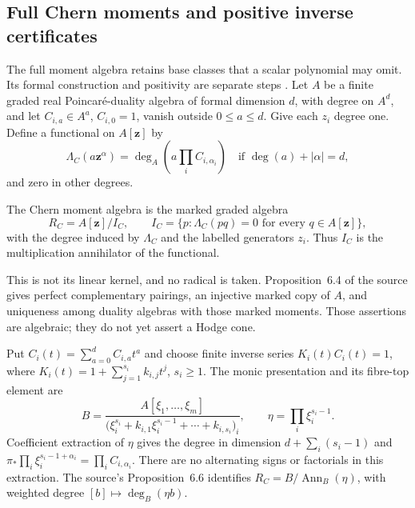 \subsection{Full Chern moments and positive inverse certificates}
\label{sec:appF-Chern-moments}

The full moment algebra retains base classes that a scalar polynomial
may omit. Its formal construction and positivity are separate steps
\cite[\S6]{NguyenDangWang26ChernFlowV4}.
Let $A$ be a finite graded real Poincar\'e-duality algebra of formal
dimension $d$, with degree on $A^d$, and let $C_{i,a}\in A^a$,
$C_{i,0}=1$, vanish outside $0\leq a\leq d$.
Give each $z_i$ degree one. Define a functional on $A[\mathbf z]$ by
\[
 \Lambda_C(a\mathbf z^\alpha)
     =\deg_A\left(a\prod_i C_{i,\alpha_i}\right)
       \quad\text{if }\deg(a)+|\alpha|=d,
\tag{F.35}\label{eq:appF-Chern-moment-functional}
\]
and zero in other degrees.
\begin{definition}
\label{def:appF-Chern-moment-algebra}
The Chern moment algebra is the marked graded algebra
\[
 R_C=A[\mathbf z]/I_C,\qquad
 I_C=\{p:\Lambda_C(pq)=0\text{ for every }q\in A[\mathbf z]\},
\tag{F.36}\label{eq:appF-Chern-moment-algebra}
\]
with the degree induced by $\Lambda_C$ and the labelled generators
$z_i$. Thus $I_C$ is the multiplication annihilator of the functional.
\end{definition}

This is not its linear kernel, and no radical is taken.
Proposition~6.4 of the source gives perfect complementary pairings,
an injective marked copy of $A$, and uniqueness among duality
algebras with those marked moments. Those assertions are algebraic;
they do not yet assert a Hodge cone.

Put $C_i(t)=\sum_{a=0}^d C_{i,a}t^a$ and choose finite inverse
series $K_i(t)C_i(t)=1$, where
$K_i(t)=1+\sum_{j=1}^{s_i}k_{i,j}t^j$, $s_i\geq1$.
The monic presentation and its fibre-top element are
\[
 B=\frac{A[\xi_1,\ldots,\xi_m]}
 {\bigl(\xi_i^{s_i}+k_{i,1}\xi_i^{s_i-1}
                          +\cdots+k_{i,s_i}\bigr)_i},
 \qquad\eta=\prod_i\xi_i^{s_i-1}.
\tag{F.37}\label{eq:appF-Chern-monic-certificate}
\]
Coefficient extraction of $\eta$ gives the degree in dimension
$d+\sum_i(s_i-1)$ and
$\pi_*\prod_i\xi_i^{s_i-1+\alpha_i}=\prod_i C_{i,\alpha_i}$.
There are no alternating signs or factorials in this extraction.
The source's Proposition~6.6 identifies
$R_C=B/\operatorname{Ann}_B(\eta)$, with weighted degree
$[b]\mapsto\deg_B(\eta b)$.

